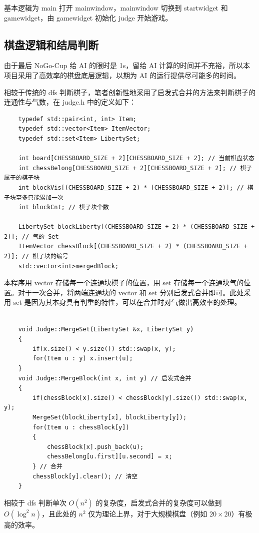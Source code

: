 \documentclass{noithesis}
\begin{document}
	基本逻辑为 main 打开 mainwindow，mainwindow 切换到 startwidget 和 gamewidget，由 gamewidget 初始化 judge 开始游戏。

	\subsection{棋盘逻辑和结局判断}
	
	由于最后 NoGo-Cup 给 AI 的限时是 1s，留给 AI 计算的时间并不充裕，所以本项目采用了高效率的棋盘底层逻辑，以期为 AI 的运行提供尽可能多的时间。
	
	相较于传统的 dfs 判断棋子，笔者创新性地采用了启发式合并的方法来判断棋子的连通性与气数，在 judge.h 中的定义如下：
	
	\begin{lstlisting}
	typedef std::pair<int, int> Item;
	typedef std::vector<Item> ItemVector;
	typedef std::set<Item> LibertySet;

	int board[CHESSBOARD_SIZE + 2][CHESSBOARD_SIZE + 2]; // 当前棋盘状态
	int chessBelong[CHESSBOARD_SIZE + 2][CHESSBOARD_SIZE + 2]; // 棋子属于的棋子块
	int blockVis[(CHESSBOARD_SIZE + 2) * (CHESSBOARD_SIZE + 2)]; // 棋子块至多只能累加一次
	int blockCnt; // 棋子块个数
	
	LibertySet blockLiberty[(CHESSBOARD_SIZE + 2) * (CHESSBOARD_SIZE + 2)]; // 气的 Set
	ItemVector chessBlock[(CHESSBOARD_SIZE + 2) * (CHESSBOARD_SIZE + 2)]; // 棋子块的编号
	std::vector<int>mergedBlock;
	\end{lstlisting}

	本程序用 vector 存储每一个连通块棋子的位置，用 set 存储每一个连通块气的位置。对于一次合并，将两端连通块的 vector 和 set 分别启发式合并即可。此处采用 set 是因为其本身具有判重的特性，可以在合并时对气做出高效率的处理。
	
	\begin{lstlisting}
		
	void Judge::MergeSet(LibertySet &x, LibertySet y)
	{
		if(x.size() < y.size()) std::swap(x, y);
		for(Item u : y) x.insert(u);
	}
	void Judge::MergeBlock(int x, int y) // 启发式合并
	{
		if(chessBlock[x].size() < chessBlock[y].size()) std::swap(x, y);
		MergeSet(blockLiberty[x], blockLiberty[y]);
		for(Item u : chessBlock[y])
		{
			chessBlock[x].push_back(u);
			chessBelong[u.first][u.second] = x;
		} // 合并
		chessBlock[y].clear(); // 清空
	}
	\end{lstlisting}

	相较于 dfs 判断单次 $O\left(n^2\right)$ 的复杂度，启发式合并的复杂度可以做到 $O\left(\log^2 n\right)$，且此处的 $n^2$ 仅为理论上界，对于大规模棋盘（例如 $20\times 20$）有极高的效率。
	
\end{document}
